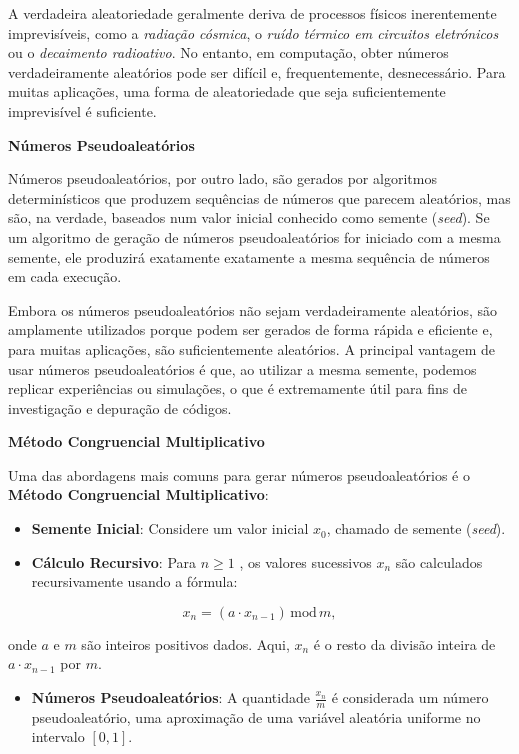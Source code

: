 \documentclass[
]{book}
\providecommand{\tightlist}{%
  \setlength{\itemsep}{0pt}\setlength{\parskip}{0pt}}
\begin{document}
A verdadeira aleatoriedade geralmente deriva de processos físicos
inerentemente imprevisíveis, como a \emph{radiação cósmica}, o \emph{ruído térmico em circuitos eletrónicos} ou o \emph{decaimento radioativo}. No entanto, em
computação, obter números verdadeiramente aleatórios pode ser difícil e,
frequentemente, desnecessário. Para muitas aplicações, uma forma de
aleatoriedade que seja suficientemente imprevisível é suficiente.

\textbf{Números Pseudoaleatórios}

Números pseudoaleatórios, por outro lado, são gerados por algoritmos
determinísticos que produzem sequências de números que parecem
aleatórios, mas são, na verdade, baseados num valor inicial conhecido
como semente (\emph{seed}). Se um algoritmo de geração de números
pseudoaleatórios for iniciado com a mesma semente, ele produzirá
exatamente exatamente a mesma sequência de números em cada execução.

Embora os números pseudoaleatórios não sejam verdadeiramente aleatórios,
são amplamente utilizados porque podem ser gerados de forma rápida e
eficiente e, para muitas aplicações, são suficientemente aleatórios. A
principal vantagem de usar números pseudoaleatórios é que, ao utilizar a
mesma semente, podemos replicar experiências ou simulações, o que é
extremamente útil para fins de investigação e depuração de códigos.

\textbf{Método Congruencial Multiplicativo}

Uma das abordagens mais comuns para gerar números pseudoaleatórios é o
\textbf{Método Congruencial Multiplicativo}:

\begin{itemize}
\tightlist
\item
  \textbf{Semente Inicial}: Considere um valor inicial \(x_0\), chamado de
  semente (\emph{seed}).
\item
  \textbf{Cálculo Recursivo}: Para \(n \geq 1\) , os valores sucessivos \(x_n\)
  são calculados recursivamente usando a fórmula:
\end{itemize}

\[x_n = (a \cdot x_{n-1}) \, \text{mod} \, m,\]

onde \(a\) e \(m\) são inteiros positivos dados. Aqui, \(x_n\) é o resto da
divisão inteira de \(a \cdot x_{n-1}\) por \(m\).

\begin{itemize}
\tightlist
\item
  \textbf{Números Pseudoaleatórios}: A quantidade \(\frac{x_n}{m}\) é
  considerada um número pseudoaleatório, uma aproximação de uma
  variável aleatória uniforme no intervalo \([0,1]\).
\end{itemize}
\end{document}
